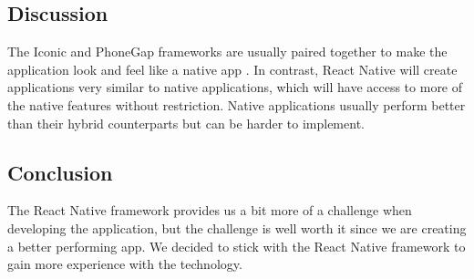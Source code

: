 \documentclass[onecolumn, draftclsnofoot,10pt, compsoc]{IEEEtran}
\begin{document}
\subsection{Discussion}

The Iconic and PhoneGap frameworks are usually paired together to make the application look and feel like a native app \cite{iconic}. In contrast, React Native will create applications very similar to native applications, which will have access to more of the native features without restriction. Native applications usually perform better than their hybrid counterparts but can be harder to implement.
\subsection{Conclusion}

The React Native framework provides us a bit more of a challenge when developing the application, but the challenge is well worth it since we are creating a better performing app. We decided to stick with the React Native framework to gain more experience with the technology.

\clearpage


\end{document}
